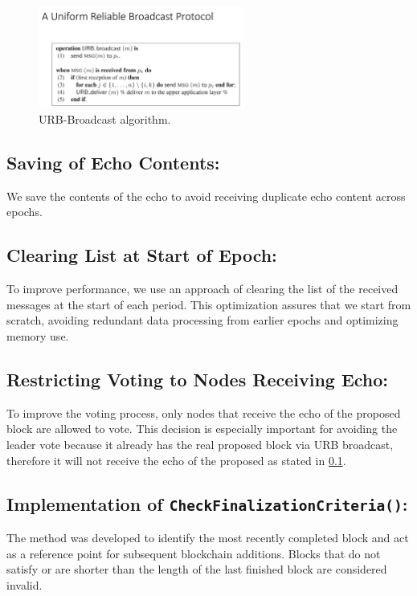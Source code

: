 \documentclass[11pt]{report}
\begin{document}
\vspace{20pt}
\begin{figure}[h]
    \centering
    \includegraphics[width=0.6\textwidth]{urb.png}
    \caption{URB-Broadcast algorithm.}
\end{figure}
\vspace{20pt}

\pagebreak

\subsection{Saving of Echo Contents:} \label{2.2}

We save the contents of the echo to avoid receiving duplicate echo content across epochs.

\subsection{Clearing List at Start of Epoch:}

To improve performance, we use an approach of clearing the list of the received messages at the start of each period. This optimization assures that we start from scratch, avoiding redundant data processing from earlier epochs and optimizing memory use.


\subsection{Restricting Voting to Nodes Receiving Echo:}

To improve the voting process, only nodes that receive the echo of the proposed block are allowed to vote. This decision is especially important for avoiding the leader vote because it already has the real proposed block via URB broadcast, therefore it will not receive the echo of the proposed as stated in \ref{2.2}.

\subsection{Implementation of \texttt{CheckFinalizationCriteria()}:}

The method was developed to identify the most recently completed block and act as a reference point for subsequent blockchain additions. Blocks that do not satisfy or are shorter than the length of the last finished block are considered invalid.
\end{document}
